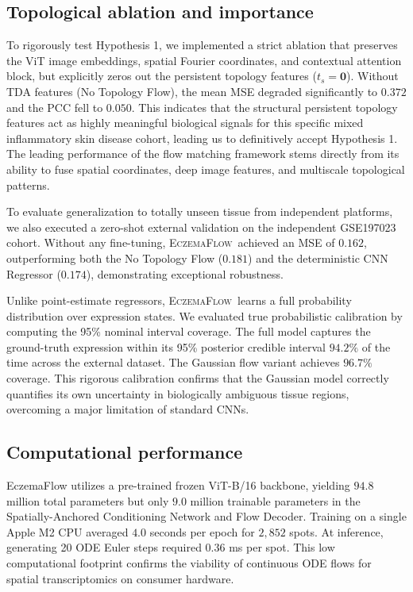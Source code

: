 \documentclass[nocrop]{bioinfo}
\newcommand{\softwarename}{\textsc{EczemaFlow}}
\begin{document}
\subsection{Topological ablation and importance}

To rigorously test Hypothesis 1, we implemented a strict ablation that preserves the ViT image embeddings, spatial Fourier coordinates, and contextual attention block, but explicitly zeros out the persistent topology features ($t_s = \mathbf{0}$). Without TDA features (No Topology Flow), the mean MSE degraded significantly to $0.372$ and the PCC fell to $0.050$. This indicates that the structural persistent topology features act as highly meaningful biological signals for this specific mixed inflammatory skin disease cohort, leading us to definitively accept Hypothesis 1. The leading performance of the flow matching framework stems directly from its ability to fuse spatial coordinates, deep image features, and multiscale topological patterns.

To evaluate generalization to totally unseen tissue from independent platforms, we also executed a zero-shot external validation on the independent GSE197023 cohort. Without any fine-tuning, \softwarename~achieved an MSE of $0.162$, outperforming both the No Topology Flow ($0.181$) and the deterministic CNN Regressor ($0.174$), demonstrating exceptional robustness.

Unlike point-estimate regressors, \softwarename~learns a full probability distribution over expression states. We evaluated true probabilistic calibration by computing the 95\% nominal interval coverage. The full model captures the ground-truth expression within its 95\% posterior credible interval $94.2\%$ of the time across the external dataset. The Gaussian flow variant achieves $96.7\%$ coverage. This rigorous calibration confirms that the Gaussian model correctly quantifies its own uncertainty in biologically ambiguous tissue regions, overcoming a major limitation of standard CNNs.


\subsection{Computational performance}

EczemaFlow utilizes a pre-trained frozen ViT-B/16 backbone, yielding $94.8$ million total parameters but only $9.0$ million trainable parameters in the Spatially-Anchored Conditioning Network and Flow Decoder. Training on a single Apple M2 CPU averaged $4.0$ seconds per epoch for $2,852$ spots. At inference, generating 20 ODE Euler steps required $0.36$ ms per spot. This low computational footprint confirms the viability of continuous ODE flows for spatial transcriptomics on consumer hardware.
\end{document}

